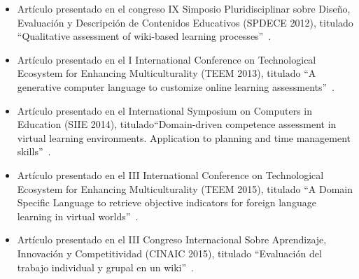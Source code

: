 	\begin{itemize}
	\item Artículo presentado en el congreso IX Simposio Pluridisciplinar sobre Diseño, Evaluación y Descripción de Contenidos Educativos (SPDECE 2012), titulado ``Qualitative assessment of wiki-based learning processes''~\cite{Balderas:2012}.
	\item Artículo presentado en el I International Conference on Technological Ecosystem for Enhancing Multiculturality (TEEM 2013), titulado ``A generative computer language to customize online learning assessments''~\cite{balderas2013generative}.
	\item Artículo presentado en el International Symposium on Computers in Education (SIIE 2014), titulado``Domain-driven competence assessment in virtual learning environments. Application to planning and time management skills''~\cite{balderas2014domain}.
	\item Artículo presentado en el III International Conference on Technological Ecosystem for Enhancing Multiculturality (TEEM 2015), titulado ``A Domain Specific Language to retrieve objective indicators for foreign language learning in virtual worlds''~\cite{balderas2015domain}.
	\item Artículo presentado en el  III Congreso Internacional Sobre Aprendizaje, Innovación y Competitividad (CINAIC 2015), titulado ``Evaluación del trabajo individual y grupal en un wiki''~\cite{reinoso2015evaluacion}.
	\end{itemize}



